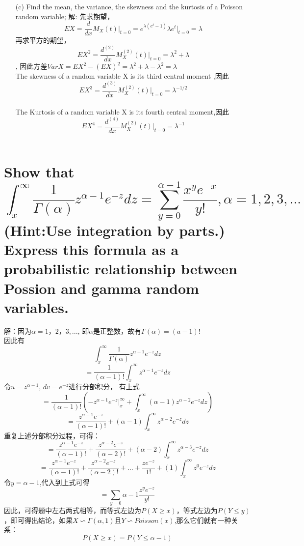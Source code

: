 \documentclass [12pt]{article}
\begin{document}
\begin{CJK*}{GBK}{kai}
\begin{enumerate}
	\item[(c)]	Find the mean, the variance, the skewness and the kurtosis of a Poisson random variable;
		 解: 先求期望，$$EX=\frac{d}{dx}M_{X}(t)\vert_{t=0}=e^{\lambda(e^t-1)}\lambda e^t \vert_{t=0}=\lambda$$
		 再求平方的期望，$$EX^2=\frac{d^{(2)}}{dx}M_{X}^{(2)}(t)\vert_{t=0}=\lambda^2+\lambda$$,
		因此方差$VarX=EX^2-(EX)^2 =\lambda^2+\lambda-\lambda^2=\lambda$\\
		The skewness of a random variable X is its third central moment ,因此$$EX^3=\frac{d^{(3)}}{dx}M_{X}^{(2)}(t)\vert_{t=0}=\lambda^{-1/2}$$\\
		The Kurtosis of a random variable X is its fourth central moment,因此$$EX^4=\frac{d^{(4)}}{dx}M_{X}^{(2)}(t)\vert_{t=0}=\lambda^{-1}$$\\
  \end{enumerate}

\section{Show that\\
     $$\int_{x}^{\infty}\frac{1}{\Gamma(\alpha)}z^{\alpha-1}e^{-z}dz=\sum_{y=0}^{\alpha-1}\frac{x^ye^{-x}}{y!},\alpha=1,2,3,...$$ (Hint:Use integration by parts.) Express this formula as a probabilistic relationship between Possion and gamma random variables.}
    
	解：因为$\alpha=1，2，3,...$, 即$\alpha $是正整数，故有$\Gamma(\alpha)=(a-1)!$\\
	因此有$$\int_{x}^{\infty}\frac{1}{\Gamma(\alpha)}z^{\alpha-1}e^{-z}dz$$
	$$=\frac{1}{(\alpha-1)!}\int_{x}^{\infty}z^{\alpha-1}e^{-z}dz$$
	令$u=z^{\alpha-1}$, $dv=e^{-z}$进行分部积分，
	有上式$$=\frac{1}{(\alpha-1)!} \left( -z^{\alpha-1}e^{-z} \vert_{x}^{\infty}+\int_{x}^{\infty}(\alpha-1)z^{\alpha-2}e^{-z}dz \right)$$
	$$=\frac{z^{\alpha-1}e^{-z} }{(\alpha-1)!} +(\alpha-1)\int_{x}^{\infty}z^{\alpha-2}e^{-z}dz$$
	重复上述分部积分过程，可得：
	$$=\frac{z^{\alpha-1}e^{-z} }{(\alpha-1)!} +\frac{z^{\alpha-2}e^{-z} }{(\alpha-2)!} +(\alpha-2)\int_{x}^{\infty}z^{\alpha-3}e^{-z}dz$$
	$$=\frac{z^{\alpha-1}e^{-z} }{(\alpha-1)!} +\frac{z^{\alpha-2}e^{-z} }{(\alpha-2)!} +...+ \frac{z e^{-z}}{1!}+(1)\int_{x}^{\infty}z^{0}e^{-z}dz$$
	令$y=\alpha-1$,代入到上式可得
	$$=\sum_{y=0}{\alpha-1}\frac{z^y e^{-z}}{y!}$$
	因此，可得题中左右两式相等，而等式左边为$P (X ≥ x) $，等式左边为$P (Y ≤ y) $，即可得出结论，如果$X \backsim \Gamma(\alpha,1)$且$Y\backsim Poisson(x)$,那么它们就有一种关系：
	$$P (X \ge x) = P (Y \le \alpha - 1)$$
		


  \end{CJK*}
\end{document}
